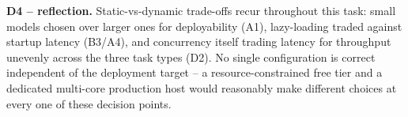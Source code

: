 \documentclass[11pt,a4paper]{article}
\begin{document}
\textbf{D4 -- reflection.} Static-vs-dynamic trade-offs recur throughout this task: small
models chosen over larger ones for deployability (A1), lazy-loading traded against startup
latency (B3/A4), and concurrency itself trading latency for throughput unevenly across the
three task types (D2). No single configuration is correct independent of the deployment
target -- a resource-constrained free tier and a dedicated multi-core production host would
reasonably make different choices at every one of these decision points.
\end{document}
